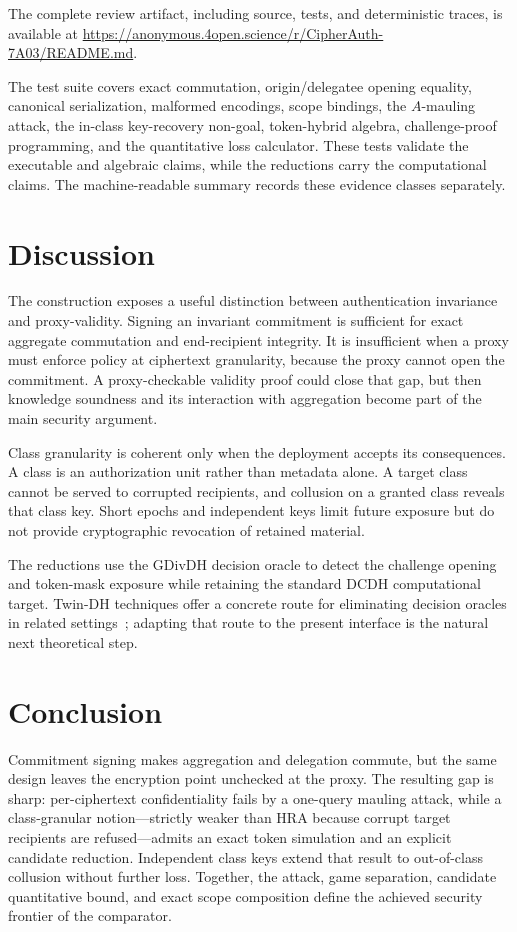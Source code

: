 \documentclass[11pt,letterpaper]{article}
\theoremstyle{definition}
\theoremstyle{remark}
\newcommand{\artifacturl}{\url{https://anonymous.4open.science/r/CipherAuth-7A03/README.md}}
\begin{document}
The complete review artifact, including source, tests, and deterministic traces,
is available at \artifacturl.

The test suite covers exact commutation, origin/delegatee opening equality,
canonical serialization, malformed encodings, scope bindings, the \(A\)-mauling
attack, the in-class key-recovery non-goal, token-hybrid algebra, challenge-proof
programming, and the quantitative loss calculator.  These tests validate the
executable and algebraic claims, while the reductions carry the computational
claims.  The machine-readable summary records these evidence classes separately.

\section{Discussion}

The construction exposes a useful distinction between authentication invariance
and proxy-validity.  Signing an invariant commitment is sufficient for exact
aggregate commutation and end-recipient integrity.  It is insufficient when a
proxy must enforce policy at ciphertext granularity, because the proxy cannot open
the commitment.  A proxy-checkable validity proof could close that gap, but then
knowledge soundness and its interaction with aggregation become part of the main
security argument.

Class granularity is coherent only when the deployment accepts its consequences.
A class is an authorization unit rather than metadata alone.  A target class cannot be
served to corrupted recipients, and collusion on a granted class reveals that
class key.  Short epochs and independent keys limit future exposure but do not
provide cryptographic revocation of retained material.

The reductions use the GDivDH decision oracle to detect the challenge opening and
token-mask exposure while retaining the standard DCDH computational target.
Twin-DH techniques offer a concrete route for eliminating decision oracles in
related settings~\cite{CKS08}; adapting that route to the present interface is the
natural next theoretical step.

\section{Conclusion}

Commitment signing makes aggregation and delegation commute, but the same design
leaves the encryption point unchecked at the proxy.  The resulting gap is sharp:
per-ciphertext confidentiality fails by a one-query mauling attack, while a
class-granular notion---strictly weaker than HRA because corrupt target recipients
are refused---admits an exact token simulation and an explicit candidate
reduction.  Independent class keys extend that result to out-of-class collusion
without further loss.  Together, the attack, game separation, candidate
quantitative bound, and exact scope composition define the achieved security
frontier of the comparator.
\end{document}
